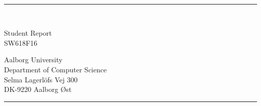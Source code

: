 \newcommand{\titlefont}{\sffamily\fontsize{36pt}{0pt}\selectfont}
\newcommand{\subtitlefont}{\sffamily\fontsize{26pt}{0pt}\selectfont}
\newcommand{\otherfont}{\sffamily\fontsize{18pt}{0pt}\selectfont}
\begin{titlepage}
    \addtolength{\hoffset}{0.5\evensidemargin-0.5\oddsidemargin}
    \noindent
    \vspace{1.5cm}
    \begin{center}
        {
            \titlefont
            \TITLE
        }\hfill \\
        \textcolor{aaublue}{\rule{180pt}{2pt}}\\
        \vspace{10pt}
        {\subtitlefont
            \SUBTITLE
        }
    \end{center}
    \vspace{4cm}
    \begin{center}
            \otherfont
            Student Report\\
            SW618F16
    \end{center}
    \vfill
    \noindent
\hfill
\begin{minipage}{0.8\linewidth}
    \begin{flushright}
        \sffamily\fontsize{14pt}{0pt}\selectfont
        Aalborg University\\
        Department of Computer Science\\
        Selma Lagerl{\"o}fs Vej 300\\
        DK-9220 Aalborg {\O}st
    \end{flushright}
\end{minipage}
%
\begin{minipage}{0.02\linewidth}
    \textcolor{aaublue}{\rule{1pt}{5\baselineskip}}
\end{minipage}
    \titlepagedecoration
\end{titlepage}
\clearpage 
